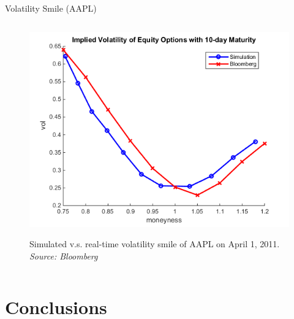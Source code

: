 \documentclass{beamer}
\begin{document}
\begin{frame}[shrink=50]{{\color{cyan}Volatility Smile ({\color{magenta}AAPL})}}
\bigskip
\begin{columns}
\begin{column}{0.7\textwidth}
\begin{figure}[htbp]
                \centering
                \includegraphics[height=1.2\textheight]{implied_vol.png}\\
                \caption{Simulated v.s. real-time volatility smile of AAPL on April 1, 2011. \textit{Source: Bloomberg}}
                \label{fig:AAPL_VolSmile_SimvsReal}
\end{figure}
\end{column}
\end{columns}

\end{frame}

\section{Conclusions}
\end{document}
